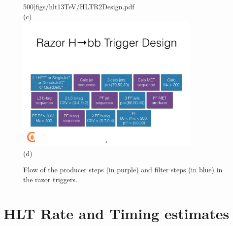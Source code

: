\begin{figure}[ht!]
500]{figs/hlt13TeV/HLTR2Design.pdf}\\
(c)\\
\includegraphics[width=0.8\textwidth,clip=true,viewport=0 110 1024
500]{figs/hlt13TeV/HLTRazorHbbDesign.pdf}\\
(d)
\caption{\label{fig:HLTdesign} Flow of the producer steps (in purple)
  and filter steps (in blue) in
  the razor triggers.}
\end{figure}

\section{HLT Rate and Timing estimates}


